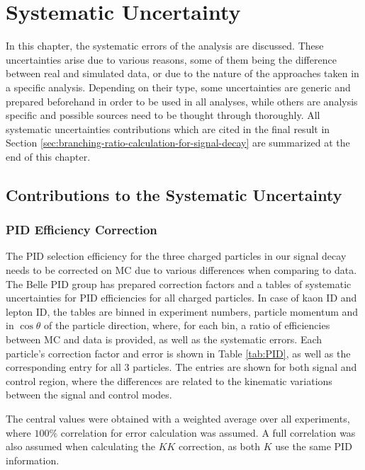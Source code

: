 \chapter{Systematic Uncertainty}\label{sec:systematic-uncertainty}
In this chapter, the systematic errors of the analysis are discussed. These uncertainties arise due to various reasons, some of them being the difference between real and simulated data, or due to the nature of the approaches taken in a specific analysis. Depending on their type, some uncertainties are generic and prepared beforehand in order to be used in all analyses, while others are analysis specific and possible sources need to be thought through thoroughly. All systematic uncertainties contributions which are cited in the final result in Section \ref{sec:branching-ratio-calculation-for-signal-decay} are summarized at the end of this chapter.

\section{Contributions to the Systematic Uncertainty}

\subsection{PID Efficiency Correction}\label{sec:pid-efficiency-correction}

The PID selection efficiency for the three charged particles in our signal decay needs to be corrected on MC due to various differences when comparing to data. The Belle PID group has prepared correction factors and a tables of systematic uncertainties for PID efficiencies for all charged particles. In case of kaon ID and lepton ID, the tables are binned in experiment numbers, particle momentum and in $\cos\theta$ of the particle direction, where, for each bin, a ratio of efficiencies between MC and data is provided, as well as the systematic errors. Each particle's correction factor and error is shown in Table \ref{tab:PID}, as well as the corresponding entry for all 3 particles. The entries are shown for both signal and control region, where the differences are related to the kinematic variations between the signal and control modes.

The central values were obtained with a weighted average over all experiments, where $100\%$ correlation for error calculation was assumed. A full correlation was also assumed when calculating the $KK$ correction, as both $K$ use the same PID information.

